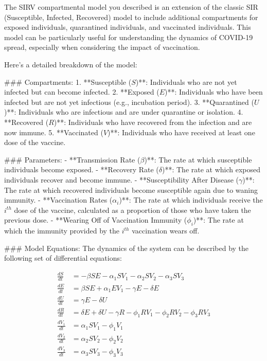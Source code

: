 The SIRV compartmental model you described is an extension of the classic SIR (Susceptible, Infected, Recovered) model to include additional compartments for exposed individuals, quarantined individuals, and vaccinated individuals. This model can be particularly useful for understanding the dynamics of COVID-19 spread, especially when considering the impact of vaccination.

Here's a detailed breakdown of the model:

### Compartments:
1. **Susceptible (\(S\))**: Individuals who are not yet infected but can become infected.
2. **Exposed (\(E\))**: Individuals who have been infected but are not yet infectious (e.g., incubation period).
3. **Quarantined (\(U\))**: Individuals who are infectious and are under quarantine or isolation.
4. **Recovered (\(R\))**: Individuals who have recovered from the infection and are now immune.
5. **Vaccinated (\(V\))**: Individuals who have received at least one dose of the vaccine.

### Parameters:
- **Transmission Rate (\(\beta\))**: The rate at which susceptible individuals become exposed.
- **Recovery Rate (\(\delta\))**: The rate at which exposed individuals recover and become immune.
- **Susceptibility After Disease (\(\gamma\))**: The rate at which recovered individuals become susceptible again due to waning immunity.
- **Vaccination Rates (\(\alpha_i\))**: The rate at which individuals receive the \(i^{th}\) dose of the vaccine, calculated as a proportion of those who have taken the previous dose.
- **Wearing Off of Vaccination Immunity (\(\phi_i\))**: The rate at which the immunity provided by the \(i^{th}\) vaccination wears off.

### Model Equations:
The dynamics of the system can be described by the following set of differential equations:

\[
\begin{align*}
\frac{dS}{dt} &= -\beta SE - \alpha_1 S V_1 - \alpha_2 S V_2 - \alpha_3 S V_3 \\
\frac{dE}{dt} &= \beta SE + \alpha_1 E V_1 - \gamma E - \delta E \\
\frac{dU}{dt} &= \gamma E - \delta U \\
\frac{dR}{dt} &= \delta E + \delta U - \gamma R - \phi_1 R V_1 - \phi_2 R V_2 - \phi_3 R V_3 \\
\frac{dV_1}{dt} &= \alpha_1 S V_1 - \phi_1 V_1 \\
\frac{dV_2}{dt} &= \alpha_2 S V_2 - \phi_2 V_2 \\
\frac{dV_3}{dt} &= \alpha_3 S V_3 - \phi_3 V_3
\end{align*}
\]

